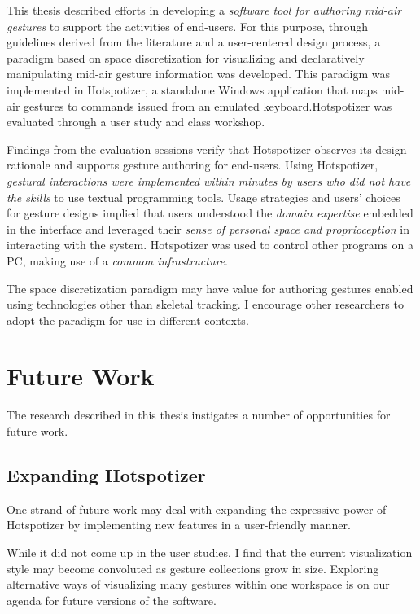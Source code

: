 This thesis described efforts in developing a \emph{software tool for authoring mid-air gestures} to support the activities of end-users. For this purpose, through guidelines derived from the literature and a user-centered design process, a paradigm based on space discretization for visualizing and declaratively manipulating mid-air gesture information was developed. This paradigm was implemented in Hotspotizer, a standalone Windows application that maps mid-air gestures to commands issued from an emulated keyboard.Hotspotizer was evaluated through a user study and class workshop.

Findings from the evaluation sessions verify that Hotspotizer observes its design rationale and supports gesture authoring for end-users. Using Hotspotizer, \emph{gestural interactions were implemented within minutes by users who did not have the skills} to use textual programming tools. Usage strategies and users' choices for gesture designs implied that users understood the \emph{domain expertise} embedded in the interface and leveraged their \emph{sense of personal space and proprioception} in interacting with the system. Hotspotizer was used to control other programs on a PC, making use of a \emph{common infrastructure}.

The space discretization paradigm may have value for authoring gestures enabled using technologies other than skeletal tracking. I encourage other researchers to adopt the paradigm for use in different contexts.

\section{Future Work}
\label{sec:future-work}

The research described in this thesis instigates a number of opportunities for future work.

\subsection{Expanding Hotspotizer}

One strand of future work may deal with expanding the expressive power of Hotspotizer by implementing new features in a user-friendly manner.

While it did not come up in the user studies, I find that the current visualization style may become convoluted as gesture collections grow in size. Exploring alternative ways of visualizing many gestures within one workspace is on our agenda for future versions of the software.

